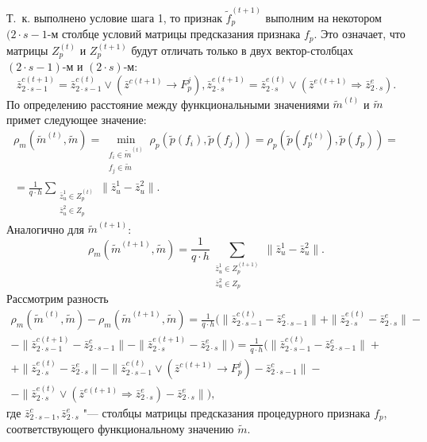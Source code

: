 \begin{Proof}
	Т.~к. выполнено условие шага 1, то признак $\tilde f_p^{(t+1)}$ выполним на некотором $(2\cdot s-1$-м столбце условий матрицы предсказания признака $f_p$. Это означает, что матрицы $Z_p^{(t)}$ и $Z_p^{(t+1)}$ будут отличать только в двух вектор-столбцах $(2\cdot s-1)$-м и $(2\cdot s)$-м:
	\begin{equation}
		\bar z_{2\cdot s-1}^{c(t+1)}=\bar z_{2\cdot s-1}^{c(t)}\vee (\bar z^{c(t+1)}\rightarrow F_p^j),\bar z_{2\cdot s}^{e(t+1)}=\bar z_{2\cdot s}^{e(t)}\vee(\bar z^{e(t+1)}\Rightarrow \bar z_{2\cdot s}^e).
	\end{equation}
	По определению расстояние между функциональными значениями $\tilde m^{(t)}$ и $\tilde m$ примет следующее значение:
	\begin{eqnarray}
		\rho_m(\tilde m^{(t)},\tilde m)=\min\limits_{\substack{f_i\in\tilde m^{(t)}\\f_j\in\tilde m}}\rho_p(\tilde p(f_i),\tilde p(f_j ))=\rho_p(\tilde p(f_p^{(t)}),\tilde p(f_p))=\nonumber \\
		=\frac{1}{q\cdot h}\sum\limits_{\substack{\bar z_u^1\in Z_p^{(t)}\\\bar z_u^2\in Z_p}}\|\bar z_u^1-\bar z_u^2\|.
	\end{eqnarray}
	Аналогично для $\tilde m^{(t+1)}$:
	\begin{equation}
		\rho_m(\tilde m^{(t+1)},\tilde m)=\frac{1}{q\cdot h}\sum_{\substack{\bar z_u^1\in Z_p^{(t+1)}\\\bar z_u^2\in Z_p}}\|\bar z_u^1-\bar z_u^2\|.
	\end{equation}
	Рассмотрим разность 
	\begin{eqnarray}
		\rho_m(\tilde m^{(t)},\tilde m)-\rho_m(\tilde m^{(t+1)},\tilde m)=\frac{1}{q\cdot h}(\|\bar z_{2\cdot s-1}^{c(t)}-\bar z_{2\cdot s-1}^c\|+\|\bar z_{2\cdot s}^{e(t)}-\bar z_{2\cdot s}^e\|-\nonumber \\
		-\|\bar z_{2\cdot s-1}^{c(t+1)}-\bar z_{2\cdot s-1}^c\|-\|\bar z_{2\cdot s}^{e(t+1)}-\bar z_{2\cdot s}^e\|)=\frac{1}{q\cdot h}(\|\bar z_{2\cdot s-1}^{c(t)}-\bar z_{2\cdot s-1}^c\|+\nonumber \\
		+\|\bar z_{2\cdot s}^{e(t)}-\bar z_{2\cdot s}^e\|-\|\bar z_{2\cdot s-1}^{c(t)}\vee(\bar z^{c(t+1)}\rightarrow F_p^j)-\bar z_{2\cdot s-1}^c\|-\nonumber \\
		-\|\bar z_{2\cdot s}^{e(t)}\vee(\bar z^{e(t+1)}\Rightarrow\bar z_{2\cdot s}^e)-\bar z_{2\cdot s}^e\|),
	\end{eqnarray}
	где $\bar z_{2\cdot s-1}^c,\bar z_{2\cdot s}^e$ "--- столбцы матрицы предсказания процедурного признака $f_p$, соответствующего функциональному значению $\tilde m$.
	

\end{Proof}
